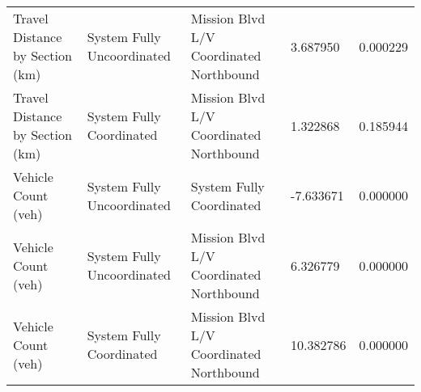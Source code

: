 \begin{tabular}{lllll}
Travel Distance by Section (km) & System Fully Uncoordinated & Mission Blvd L/V Coordinated Northbound & 3.687950 & 0.000229 \\
Travel Distance by Section (km) & System Fully Coordinated & Mission Blvd L/V Coordinated Northbound & 1.322868 & 0.185944 \\
Vehicle Count (veh) & System Fully Uncoordinated & System Fully Coordinated & -7.633671 & 0.000000 \\
Vehicle Count (veh) & System Fully Uncoordinated & Mission Blvd L/V Coordinated Northbound & 6.326779 & 0.000000 \\
Vehicle Count (veh) & System Fully Coordinated & Mission Blvd L/V Coordinated Northbound & 10.382786 & 0.000000 \\
\bottomrule
\end{tabular}
